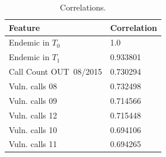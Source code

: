 \begin{table}
	\caption{Correlations.}
	\label{tab:featureCorrelations}
	\centering
	\begin{tabular}{l l }
		\toprule
		Feature & Correlation \\
		\midrule
		Endemic in $T_0$        & 1.0 \\
		Endemic in $T_1$        & 0.933801 \\
		Call Count  OUT\ 08/2015  & 0.730294 \\ %
		Vuln. calls  08 &0.732498 \\
		Vuln. calls  09   &0.714566 \\
		Vuln.  calls 12  &0.715448 \\
		Vuln. calls  10  &0.694106 \\
		Vuln. calls  11   &0.694265 \\
		\bottomrule
	\end{tabular}
\end{table}


